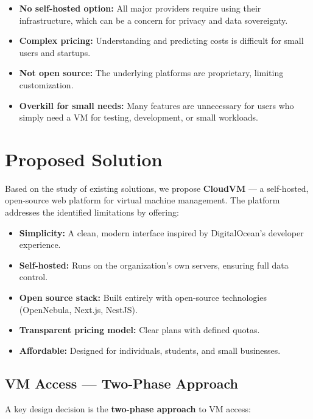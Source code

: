 \begin{itemize}
  \item \textbf{No self-hosted option:} All major providers require using their infrastructure, which can be a concern for privacy and data sovereignty.
  \item \textbf{Complex pricing:} Understanding and predicting costs is difficult for small users and startups.
  \item \textbf{Not open source:} The underlying platforms are proprietary, limiting customization.
  \item \textbf{Overkill for small needs:} Many features are unnecessary for users who simply need a VM for testing, development, or small workloads.
\end{itemize}

\section{Proposed Solution}

Based on the study of existing solutions, we propose \textbf{CloudVM} — a self-hosted, open-source web platform for virtual machine management. The platform addresses the identified limitations by offering:

\begin{itemize}
  \item \textbf{Simplicity:} A clean, modern interface inspired by DigitalOcean's developer experience.
  \item \textbf{Self-hosted:} Runs on the organization's own servers, ensuring full data control.
  \item \textbf{Open source stack:} Built entirely with open-source technologies (OpenNebula, Next.js, NestJS).
  \item \textbf{Transparent pricing model:} Clear plans with defined quotas.
  \item \textbf{Affordable:} Designed for individuals, students, and small businesses.
\end{itemize}
\subsection{VM Access --- Two-Phase Approach}

A key design decision is the \textbf{two-phase approach} to VM access:

